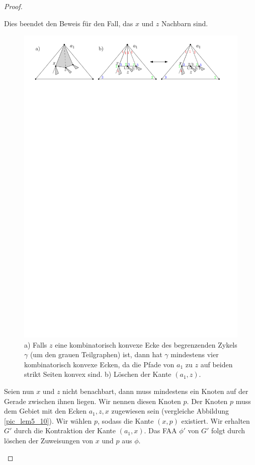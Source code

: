 \begin{proof}
\begin{description}[leftmargin =0pt, font = \bfseries]
Dies beendet den Beweis für den Fall, das $x$ und $z$ Nachbarn sind.

\begin{figure}[h]
\centering
\includegraphics[width=1\textwidth]{lem5_9.pdf}
\caption{a) Falls $z$ eine kombinatorisch konvexe Ecke des begrenzenden Zykels $\gamma$ (um den grauen Teilgraphen) ist, dann hat $\gamma$ mindestens vier kombinatorisch konvexe Ecken, da die Pfade von $a_1$ zu $z$ auf beiden strikt Seiten konvex sind. b) Löschen der Kante $(a_1,z)$. }
\label{pic_lem5_9}
\end{figure}

\item[Fall 2] Seien nun $x$ und $z$ nicht benachbart, dann muss mindestens ein Knoten auf der Gerade zwischen ihnen liegen. Wir nennen diesen Knoten $p$. Der Knoten $p$ muss dem Gebiet mit den Ecken $a_1,z,x$ zugewiesen sein (vergleiche Abbildung \ref{pic_lem5_10}). Wir wählen $p$, sodass die Kante $(x,p)$ existiert. Wir erhalten $G'$ durch die Kontraktion der Kante $(a_1,x)$. Das FAA $\phi'$ von $G'$ folgt durch löschen der Zuweisungen von $x$ und $
p$ aus $\phi$.


\end{description}
\end{proof}
